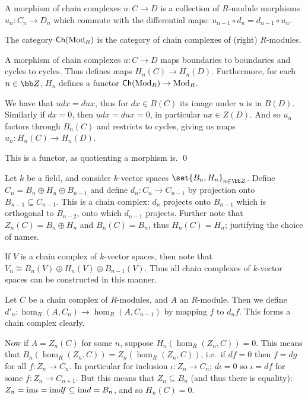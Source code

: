 \bdefn

    A {\emphcolor morphism} of chain complexes $u\colon C\to D$ is a collection of $R$-module morphisms $u_n\colon C_n\to D_n$
    which commute with the differential maps: $u_{n-1}\circ d_n=d_{n-1}\circ u_n$.

    The category ${\sf Ch}({\rm Mod}_R)$ is the category of chain complexes of (right) $R$-modules.

\edefn

\bprop

    A morphism of chain complexes $u\colon C\to D$ maps boundaries to boundaries and cycles to cycles.
    Thus defines maps $H_n(C)\to H_n(D)$.
    Furthermore, for each $n\in\bZ$, $H_n$ defines a functor ${\sf Ch}({\rm Mod}_R)\to{\rm Mod}_R$.

\eprop

\bproof

    We have that $udx=dux$, thus for $dx\in B(C)$ its image under $u$ is in $B(D)$.
    Similarly if $dx=0$, then $udx=dux=0$, in particular $ux\in Z(D)$.
    And so $u_n$ factors through $B_n(C)$ and restricts to cycles, giving us maps $u_n\colon H_n(C)\to H_n(D)$.

    This is a functor, as quotienting a morphism is.
    \qed

\eproof

\bexam

    Let $k$ be a field, and consider $k$-vector spaces $\set{B_n,H_n}_{n\in\bZ}$.
    Define $C_n=B_n\oplus H_n\oplus B_{n-1}$ and define $d_n\colon C_n\to C_{n-1}$ by projection onto $B_{n-1}\subseteq C_{n-1}$.
    This is a chain complex: $d_n$ projects onto $B_{n-1}$ which is orthogonal to $B_{n-2}$, onto which $d_{n-1}$ projects.
    Further note that $Z_n(C)=B_n\oplus H_n$ and $B_n(C)=B_n$, thus $H_n(C)=H_n$; justifying the choice of names.

    If $V$ is a chain complex of $k$-vector spaces, then note that $V_n\cong B_n(V)\oplus H_n(V)\oplus B_{n-1}(V)$.
    Thus all chain complexes of $k$-vector spaces can be constructed in this manner.

\eexam

\bexam

    Let $C$ be a chain complex of $R$-modules, and $A$ an $R$-module.
    Then we define $d'_n\colon\hom_R(A,C_n)\to\hom_R(A,C_{n-1})$ by mapping $f$ to $d_nf$.
    This forms a chain complex clearly.

    Now if $A=Z_n(C)$ for some $n$, suppose $H_n(\hom_R(Z_n,C))=0$.
    This means that $B_n(\hom_R(Z_n,C))=Z_n(\hom_R(Z_n,C))$, i.e.\ if $df=0$ then $f=dg$ for all $f\colon Z_n\to C_n$.
    In particular for inclusion $\iota\colon Z_n\to C_n$; $d\iota=0$ so $\iota=df$ for some $f\colon Z_n\to C_{n+1}$.
    But this means that $Z_n\subseteq B_n$ (and thus there is equality): $Z_n={\rm im}\iota={\rm im} df\subseteq{\rm im} d=B_n$, and so $H_n(C)=0$.

